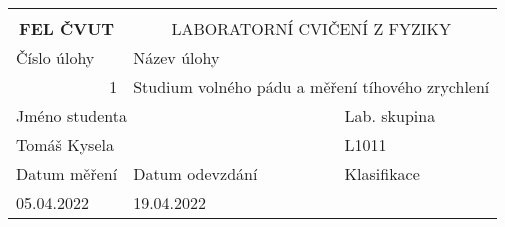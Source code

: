 \documentclass[titlepage]{article}
\begin{document}
    \begin{titlepage}
         \begin{table}[ht]
            \begin{center}
                \begin{tabular}{ | c | c | c | }
                    \hline
                    \multicolumn{1}{|l|}{} & \multicolumn{2}{l|}{}  \\ [\dimexpr-\normalbaselineskip+3pt]
                    \textbf{{\large FEL ČVUT}} 							& \multicolumn{2}{c|}{{\large LABORATORNÍ CVIČENÍ Z FYZIKY}}\\ [3pt]
                    \hline
                    \multicolumn{1}{|l|}{{\footnotesize Číslo úlohy}} 	& \multicolumn{2}{l|}{{\footnotesize Název úlohy}}\\ [3pt]
                    \multicolumn{1}{|r|}{{\large 1}} 					& \multicolumn{2}{l|}{Studium volného pádu a měření tíhového zrychlení}\\ [3pt]
                    \hline
                    \multicolumn{2}{|l|}{{\footnotesize Jméno studenta}} 										& \multicolumn{1}{l|}{{\footnotesize Lab. skupina}} \\ [3pt]
                    \multicolumn{2}{|l|}{Tomáš Kysela} 														& \multicolumn{1}{l|}{L1011}\\ [3pt]
                    \hline
                    \multicolumn{1}{|l|}{{\footnotesize Datum měření}} 	& \multicolumn{1}{l|}{{\footnotesize Datum odevzdání}} 	& \multicolumn{1}{l|}{{\footnotesize Klasifikace}} \\ [3pt]
                    \multicolumn{1}{|l|}{05.04.2022} 					& \multicolumn{1}{l|}{19.04.2022} 		& \multicolumn{1}{l|}{}\\
                    \hline
                \end{tabular}
            \end{center}
        \end{table}
    \end{titlepage}
\end{document}
